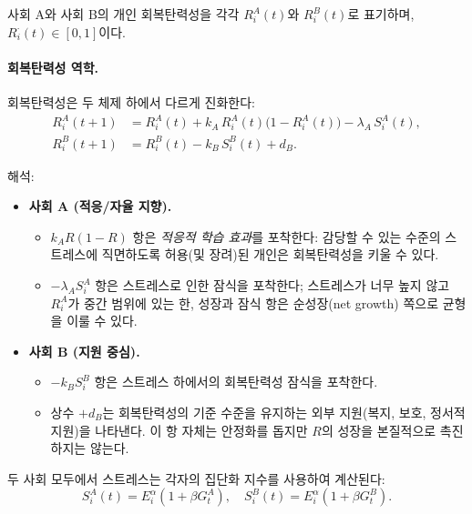 \documentclass[11pt]{article}
\theoremstyle{plain}
\begin{document}
사회 A와 사회 B의 개인 회복탄력성을 각각 $R_i^A(t)$와 $R_i^B(t)$로 표기하며, $R_i^\cdot(t) \in [0,1]$이다.

\paragraph{회복탄력성 역학.}
회복탄력성은 두 체제 하에서 다르게 진화한다:
\begin{align}
R_i^A(t+1) &= R_i^A(t)
+ k_A\, R_i^A(t)\bigl(1 - R_i^A(t)\bigr)
- \lambda_A\, S_i^A(t), \label{eq:RA}\\
R_i^B(t+1) &= R_i^B(t)
- k_B\, S_i^B(t)
+ d_B. \label{eq:RB}
\end{align}

해석:
\begin{itemize}
  \item \textbf{사회 A (적응/자율 지향).}
  \begin{itemize}
    \item $k_A R(1-R)$ 항은 \emph{적응적 학습 효과}를 포착한다: 감당할 수 있는 수준의 스트레스에 직면하도록 허용(및 장려)된 개인은 회복탄력성을 키울 수 있다.
    \item $-\lambda_A S_i^A$ 항은 스트레스로 인한 잠식을 포착한다; 스트레스가 너무 높지 않고 $R_i^A$가 중간 범위에 있는 한, 성장과 잠식 항은 순성장(net growth) 쪽으로 균형을 이룰 수 있다.
  \end{itemize}

  \item \textbf{사회 B (지원 중심).}
  \begin{itemize}
    \item $-k_B S_i^B$ 항은 스트레스 하에서의 회복탄력성 잠식을 포착한다.
    \item 상수 $+d_B$는 회복탄력성의 기준 수준을 유지하는 외부 지원(복지, 보호, 정서적 지원)을 나타낸다.
      이 항 자체는 안정화를 돕지만 $R$의 성장을 본질적으로 촉진하지는 않는다.
  \end{itemize}
\end{itemize}

두 사회 모두에서 스트레스는 각자의 집단화 지수를 사용하여 계산된다:
\[
S_i^A(t) = E_i^{\alpha} (1 + \beta G_t^A), \quad
S_i^B(t) = E_i^{\alpha} (1 + \beta G_t^B).
\]
\end{document}

